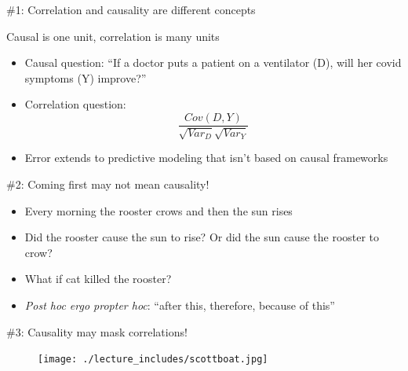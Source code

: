 \documentclass{beamer}
\begin{document}
\begin{frame}{\#1: Correlation and causality are different concepts}

  Causal is one unit, correlation is many units
  \begin{itemize}
    \item Causal question: ``If a doctor puts a patient on a ventilator (D), will her covid symptoms (Y) improve?''
    \item Correlation question:  $$\frac{Cov(D,Y)}{\sqrt{Var_D}\sqrt{{Var_Y}}}$$
    \item Error extends to predictive modeling that isn't based on causal frameworks
  \end{itemize}

\end{frame}



\begin{frame}{\#2: Coming first may not mean causality!}

  \begin{itemize}
    \item Every morning the rooster crows and then the sun rises
    \item Did the rooster cause the sun to rise? Or did the sun cause the rooster to crow?
    \item What if cat killed the rooster?
    \item \emph{Post hoc ergo propter hoc}: ``after this, therefore, because of this''
  \end{itemize}

\end{frame}

\begin{frame}{\#3: Causality may mask correlations!}

  \begin{figure}
    \centering
    \texttt{[image: ./lecture\_includes/scottboat.jpg]}
  \end{figure}

\end{frame}
\end{document}
